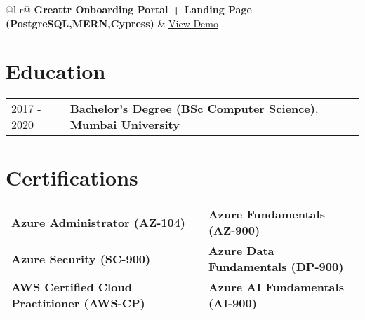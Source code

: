\documentclass[a4paper,10pt]{article}  %
\begin{document}
\begin{tabularx}{\linewidth}{ @{}l r@{} }
\textbf{Greattr Onboarding Portal + Landing Page (PostgreSQL,MERN,Cypress)} & \hfill \href{https://www.greattr.com}{View Demo} \\[3.75pt]
\end{tabularx}


\section{Education}
\begin{tabularx}{\linewidth}{@{}l X@{}}	
2017 - 2020 & \textbf{Bachelor's Degree (BSc Computer Science)}, \textbf{Mumbai University} \\ 
\end{tabularx}

\section{Certifications}
\begin{tabularx}{\linewidth}{@{}l X l@{}}
\textbf{Azure Administrator (AZ-104)} & & \textbf{Azure Fundamentals (AZ-900)} \\
\textbf{Azure Security (SC-900)} & & \textbf{Azure Data Fundamentals (DP-900)} \\
\textbf{AWS Certified Cloud Practitioner (AWS-CP)} & & \textbf{Azure AI Fundamentals (AI-900)} \\
\end{tabularx}
\end{document}
